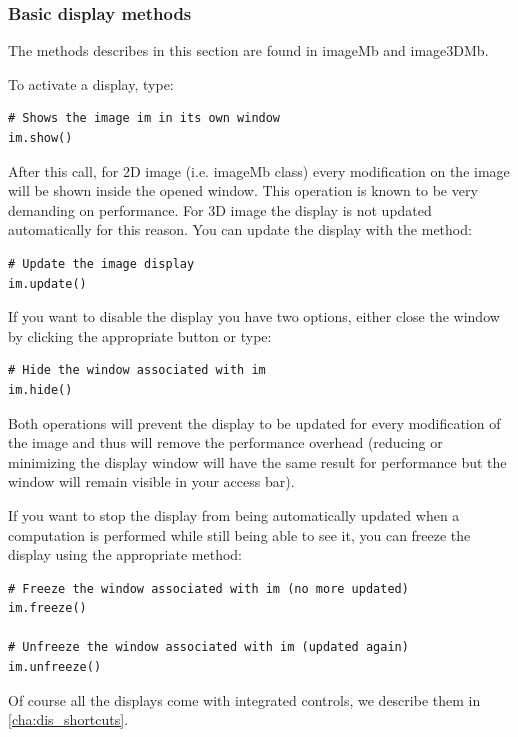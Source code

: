 \documentclass[a4paper,10pt,oneside]{article}
\begin{document}
\subsubsection{Basic display methods}

The methods describes in this section are found in imageMb and image3DMb.

To activate a display, type:

\lstset{language=Python}
\begin{lstlisting}
# Shows the image im in its own window
im.show()
\end{lstlisting}

After this call, for 2D image (i.e. imageMb class) every modification on the
image will be shown inside the opened window. This operation is known to be
very demanding on performance. For 3D image the display is not updated
automatically for this reason. You can update the display with the method:

\lstset{language=Python}
\begin{lstlisting}
# Update the image display
im.update()
\end{lstlisting}

If you want to disable the display you have two options, either close the window
by clicking the appropriate button or type:

\lstset{language=Python}
\begin{lstlisting}
# Hide the window associated with im
im.hide()
\end{lstlisting}

Both operations will prevent the display to be updated for every modification of
the image and thus will remove the performance overhead (reducing or minimizing 
the display window will have the same result for performance but the window will
remain visible in your access bar).

If you want to stop the display from being automatically updated when a 
computation is performed while still being able to see it, you can freeze the 
display using the appropriate method:

\lstset{language=Python}
\begin{lstlisting}
# Freeze the window associated with im (no more updated)
im.freeze()

# Unfreeze the window associated with im (updated again)
im.unfreeze()
\end{lstlisting}

Of course all the displays come with integrated controls, we describe them in
\ref{cha:dis_shortcuts}.
\end{document}
